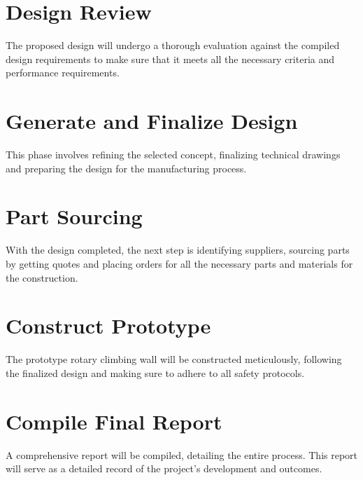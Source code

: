 \section{Design Review}
The proposed design will undergo a thorough evaluation against the compiled design requirements to make sure that it meets all the necessary criteria and performance requirements.

\section{Generate and Finalize Design}
This phase involves refining the selected concept, finalizing technical drawings and preparing the design for the manufacturing process.

\section{Part Sourcing}
With the design completed, the next step is identifying suppliers, sourcing parts by getting quotes and placing orders for all the necessary parts and materials for the construction.

\section{Construct Prototype}
The prototype rotary climbing wall will be constructed meticulously, following the finalized design and making sure to adhere to all safety protocols.

\section{Compile Final Report}
A comprehensive report will be compiled, detailing the entire process. This report will serve as a detailed record of the project's development and outcomes. 

